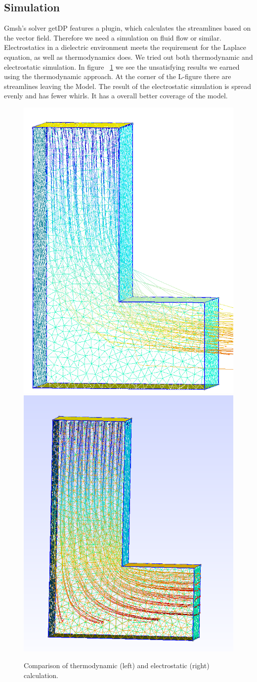 \documentclass[preprint,journal]{vgtc}       %
\begin{document}
\subsection{Simulation}
Gmsh's solver getDP features a plugin, which calculates the streamlines based on the vector field. 
Therefore we need a simulation on fluid flow or similar. 
Electrostatics in a dielectric environment meets the requirement for the Laplace equation, as well as thermodynamics does.
We tried out both thermodynamic and electrostatic simulation. 
In figure ~\ref{fig:L} we see the unsatisfying results we earned using the thermodynamic approach. 
At the corner of the L-figure there are streamlines leaving the Model. 
The result of the electrostatic simulation is spread evenly and has fewer whirls. 
It has a overall better coverage of the model.

\begin{figure}
	
	\begin{minipage}{\linewidth}
		\includegraphics[width=.5\linewidth]{L.PNG} 
		\includegraphics[width=.53\linewidth]{L-ele.png}
		\caption{Comparison of thermodynamic (left) and electrostatic (right) calculation.}
		\label{fig:L}
	\end{minipage}
\end{figure}
\end{document}
